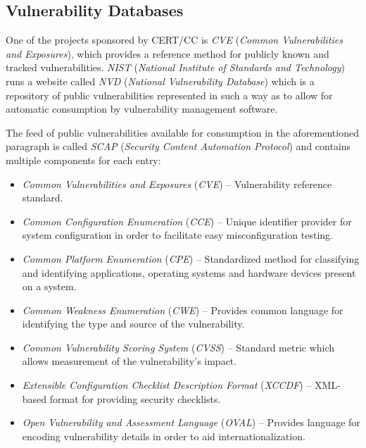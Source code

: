 \documentclass[a4paper,12pt]{article}
\begin{document}
\subsection{Vulnerability Databases} \label{vulndbs}
 
	
	One of the projects sponsored by CERT/CC is \textit{CVE} (\textit{Common Vulnerabilities and Exposures}), which provides a reference method for publicly known and tracked vulnerabilities. \textit{NIST} (\textit{National Institute of Standards and Technology}) runs a website called \textit{NVD} (\textit{National Vulnerability Database}) which is a repository of public vulnerabilities represented in such a way as to allow for automatic consumption by vulnerability management software\cite{nvd15}.
	
	The feed of public vulnerabilities available for consumption in the aforementioned paragraph is called \textit{SCAP} (\textit{Security Content Automation Protocol}) and contains multiple components for each entry:
	
	\begin{itemize}
		\item \textit{Common Vulnerabilities and Exposures} (\textit{CVE}) -- Vulnerability reference standard.
		\item \textit{Common Configuration Enumeration} (\textit{CCE}) -- Unique identifier provider for system configuration in order to facilitate easy misconfiguration testing.
		\item \textit{Common Platform Enumeration} (\textit{CPE}) -- Standardized method for classifying and identifying applications, operating systems and hardware devices present on a system.
		\item \textit{Common Weakness Enumeration} (\textit{CWE}) -- Provides common language for identifying the type and source of the vulnerability.
		\item \textit{Common Vulnerability Scoring System} (\textit{CVSS}) -- Standard metric which allows measurement of the vulnerability's impact.
		\item \textit{Extensible Configuration Checklist Description Format} (\textit{XCCDF}) -- XML-based format for providing security checklists.
		\item \textit{Open Vulnerability and Assessment Language} (\textit{OVAL}) -- Provides language for encoding vulnerability details in order to aid internationalization.
	\end{itemize}
	
\end{document}

